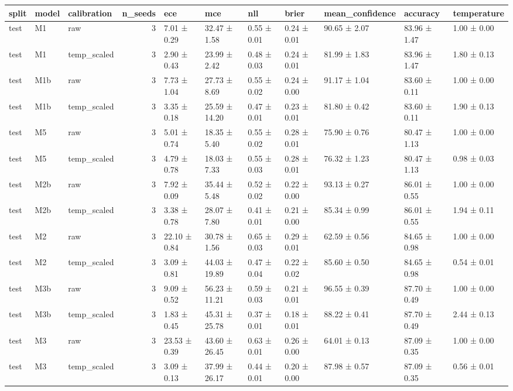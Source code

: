 \begin{tabular}{lllrlllllll}
\toprule
split & model & calibration & n\_seeds & ece & mce & nll & brier & mean\_confidence & accuracy & temperature \\
\midrule
test & M1 & raw & 3 & 7.01 ± 0.29 & 32.47 ± 1.58 & 0.55 ± 0.01 & 0.24 ± 0.01 & 90.65 ± 2.07 & 83.96 ± 1.47 & 1.00 ± 0.00 \\
test & M1 & temp\_scaled & 3 & 2.90 ± 0.43 & 23.99 ± 2.42 & 0.48 ± 0.03 & 0.24 ± 0.01 & 81.99 ± 1.83 & 83.96 ± 1.47 & 1.80 ± 0.13 \\
test & M1b & raw & 3 & 7.73 ± 1.04 & 27.73 ± 8.69 & 0.55 ± 0.02 & 0.24 ± 0.00 & 91.17 ± 1.04 & 83.60 ± 0.11 & 1.00 ± 0.00 \\
test & M1b & temp\_scaled & 3 & 3.35 ± 0.18 & 25.59 ± 14.20 & 0.47 ± 0.01 & 0.23 ± 0.01 & 81.80 ± 0.42 & 83.60 ± 0.11 & 1.90 ± 0.13 \\
test & M5 & raw & 3 & 5.01 ± 0.74 & 18.35 ± 5.40 & 0.55 ± 0.02 & 0.28 ± 0.01 & 75.90 ± 0.76 & 80.47 ± 1.13 & 1.00 ± 0.00 \\
test & M5 & temp\_scaled & 3 & 4.79 ± 0.78 & 18.03 ± 7.33 & 0.55 ± 0.03 & 0.28 ± 0.01 & 76.32 ± 1.23 & 80.47 ± 1.13 & 0.98 ± 0.03 \\
test & M2b & raw & 3 & 7.92 ± 0.09 & 35.44 ± 5.48 & 0.52 ± 0.02 & 0.22 ± 0.00 & 93.13 ± 0.27 & 86.01 ± 0.55 & 1.00 ± 0.00 \\
test & M2b & temp\_scaled & 3 & 3.38 ± 0.78 & 28.07 ± 7.80 & 0.41 ± 0.01 & 0.21 ± 0.00 & 85.34 ± 0.99 & 86.01 ± 0.55 & 1.94 ± 0.11 \\
test & M2 & raw & 3 & 22.10 ± 0.84 & 30.78 ± 1.56 & 0.65 ± 0.03 & 0.29 ± 0.01 & 62.59 ± 0.56 & 84.65 ± 0.98 & 1.00 ± 0.00 \\
test & M2 & temp\_scaled & 3 & 3.09 ± 0.81 & 44.03 ± 19.89 & 0.47 ± 0.04 & 0.22 ± 0.02 & 85.60 ± 0.50 & 84.65 ± 0.98 & 0.54 ± 0.01 \\
test & M3b & raw & 3 & 9.09 ± 0.52 & 56.23 ± 11.21 & 0.59 ± 0.03 & 0.21 ± 0.01 & 96.55 ± 0.39 & 87.70 ± 0.49 & 1.00 ± 0.00 \\
test & M3b & temp\_scaled & 3 & 1.83 ± 0.45 & 45.31 ± 25.78 & 0.37 ± 0.01 & 0.18 ± 0.01 & 88.22 ± 0.41 & 87.70 ± 0.49 & 2.44 ± 0.13 \\
test & M3 & raw & 3 & 23.53 ± 0.39 & 43.60 ± 26.45 & 0.63 ± 0.01 & 0.26 ± 0.00 & 64.01 ± 0.13 & 87.09 ± 0.35 & 1.00 ± 0.00 \\
test & M3 & temp\_scaled & 3 & 3.09 ± 0.13 & 37.99 ± 26.17 & 0.44 ± 0.01 & 0.20 ± 0.00 & 87.98 ± 0.57 & 87.09 ± 0.35 & 0.56 ± 0.01 \\

\end{tabular}

